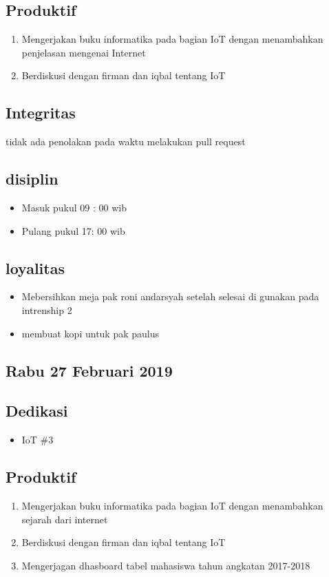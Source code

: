 \subsection{Produktif}
\begin{enumerate}
  \item Mengerjakan buku informatika pada bagian IoT dengan menambahkan penjelasan mengenai Internet
  \item Berdiskusi dengan firman dan iqbal tentang IoT
\end{enumerate}
\subsection{Integritas}
tidak ada penolakan pada waktu melakukan pull request
\subsection{disiplin}
\begin{itemize}
  \item Masuk pukul 09 : 00 wib
  \item Pulang pukul 17: 00 wib
\end{itemize}
\subsection{loyalitas}
\begin{itemize}
  \item Mebersihkan meja pak roni andarsyah setelah selesai di gunakan pada intrenship 2
  \item membuat kopi untuk pak paulus
\end{itemize}


\subsection{Rabu 27 Februari 2019}
\subsection{Dedikasi}
\begin{itemize}
  \item IoT \#3
  \end{itemize}
\subsection{Produktif}
\begin{enumerate}
  \item Mengerjakan buku informatika pada bagian IoT dengan menambahkan sejarah dari internet
  \item Berdiskusi dengan firman dan iqbal tentang IoT
  \item Mengerjagan dhasboard tabel mahasiswa tahun angkatan 2017-2018
\end{enumerate}
